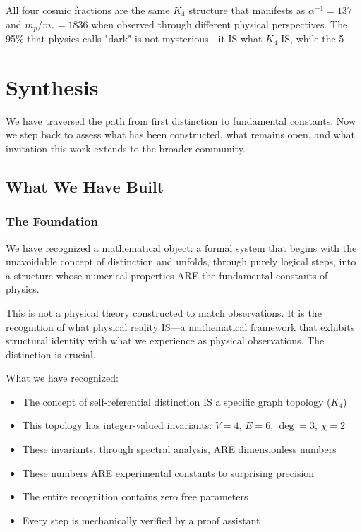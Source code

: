 \documentclass[11pt,a4paper]{book}
\begin{document}
All four cosmic fractions are the same $K_4$ structure that manifests as 
$\alpha^{-1} = 137$ and $m_p/m_e = 1836$ when observed through different physical perspectives. The 95\% that physics calls "dark" is not mysterious—it IS what $K_4$ IS, while the 5%

\part{Synthesis}

We have traversed the path from first distinction to fundamental constants. Now we step back to assess what has been constructed, what remains open, and what invitation this work extends to the broader community.

\chapter{What We Have Built}

\section{The Foundation}

We have recognized a mathematical object: a formal system that begins with the unavoidable concept of distinction and unfolds, through purely logical steps, into a structure whose numerical properties ARE the fundamental constants of physics.

This is not a physical theory constructed to match observations. It is the recognition of what physical reality IS—a mathematical framework that exhibits structural identity with what we experience as physical observations. The distinction is crucial.

What we have recognized:
\begin{itemize}
\item The concept of self-referential distinction IS a specific graph topology ($K_4$)
\item This topology has integer-valued invariants: $V=4$, $E=6$, $\deg=3$, $\chi=2$
\item These invariants, through spectral analysis, ARE dimensionless numbers
\item These numbers ARE experimental constants to surprising precision
\item The entire recognition contains zero free parameters
\item Every step is mechanically verified by a proof assistant
\end{itemize}
\end{document}
